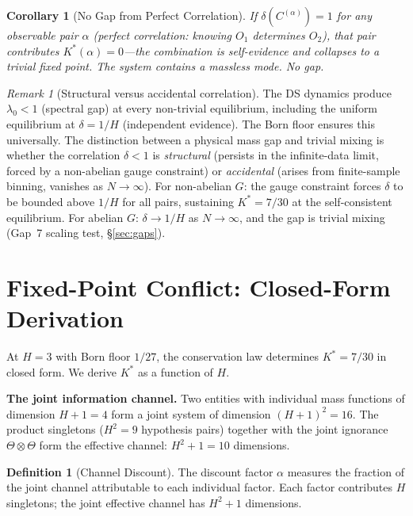 \documentclass[11pt,a4paper]{article}
\newtheorem{corollary}[theorem]{Corollary}
\theoremstyle{definition}
\newtheorem{definition}[theorem]{Definition}
\theoremstyle{remark}
\newtheorem{remark}[theorem]{Remark}
\begin{document}
\begin{corollary}[No Gap from Perfect Correlation]\label{cor:nogap}
If $\delta(C^{(\alpha)})=1$ for any observable pair $\alpha$ (perfect correlation: knowing $O_1$ determines $O_2$), that pair contributes $K^*(\alpha)=0$---the combination is self-evidence and collapses to a trivial fixed point. The system contains a massless mode. No gap.
\end{corollary}

\begin{remark}[Structural versus accidental correlation]\label{rem:structural}
The DS dynamics produce $\lambda_0<1$ (spectral gap) at every non-trivial equilibrium, including the uniform equilibrium at $\delta=1/H$ (independent evidence). The Born floor ensures this universally. The distinction between a physical mass gap and trivial mixing is whether the correlation $\delta<1$ is \emph{structural} (persists in the infinite-data limit, forced by a non-abelian gauge constraint) or \emph{accidental} (arises from finite-sample binning, vanishes as $N\to\infty$). For non-abelian $G$: the gauge constraint forces $\delta$ to be bounded above $1/H$ for all pairs, sustaining $K^*=7/30$ at the self-consistent equilibrium. For abelian $G$: $\delta\to 1/H$ as $N\to\infty$, and the gap is trivial mixing (Gap~7 scaling test, \S\ref{sec:gaps}).
\end{remark}


\section{Fixed-Point Conflict: Closed-Form Derivation}\label{sec:fixedpoint}

At $H=3$ with Born floor $1/27$, the conservation law determines $K^*=7/30$ in closed form. We derive $K^*$ as a function of $H$.

\textbf{The joint information channel.} Two entities with individual mass functions of dimension $H+1=4$ form a joint system of dimension $(H+1)^2=16$. The product singletons ($H^2=9$ hypothesis pairs) together with the joint ignorance $\Theta\otimes\Theta$ form the effective channel: $H^2+1=10$ dimensions.

\begin{definition}[Channel Discount]\label{def:discount}
The discount factor $\alpha$ measures the fraction of the joint channel attributable to each individual factor. Each factor contributes $H$ singletons; the joint effective channel has $H^2+1$ dimensions.
\end{definition}
\end{document}
